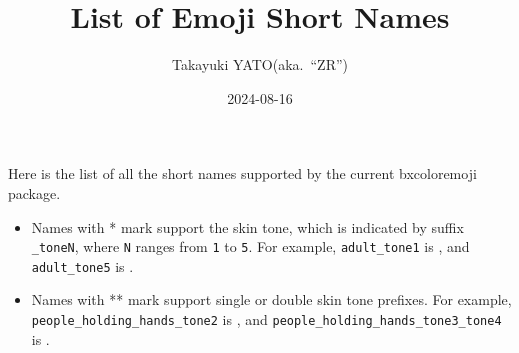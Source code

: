 \documentclass[a4paper]{article}
\title{List of Emoji Short Names}
\author{Takayuki YATO\quad (aka.~``ZR'')}
\date{2024-08-16}
\begin{document}
\maketitle

Here is the list of all the short names supported by
the current bxcoloremoji package.
\begin{itemize}
\item Names with * mark support the skin tone,
  which is indicated by suffix \verb|_toneN|,
  where \texttt{N} ranges from \texttt{1} to \texttt{5}.
  For example,
  \verb|adult_tone1| is , and
  \verb|adult_tone5| is .
\item Names with ** mark support single or double skin tone prefixes.
  For example,
  \verb|people_holding_hands_tone2| is
  , and
  \verb|people_holding_hands_tone3_tone4| is
  .
\end{itemize}

\MakeShortVerb{\!}
\setlength{\tabcolsep}{1em}
\setlength{\arrayrulewidth}{1pt}
\newcommand*{\cHead}[2]{%
  \multicolumn{1}{c}{%
    \raisebox{0pt}[1.2em][0.5em]{\makebox[#1em][c]{%
      \small\bfseries\textcolor{myhead}{#2}}}}}
\newcommand*{\cCE}[1]{%
  \raisebox{-0.2em}[1.2em][0.6em]{%
    \scalebox{1.4}{\coloremojicode{:#1:}}}}
\newcommand*{\cCS}[1]{#1}
\end{document}
